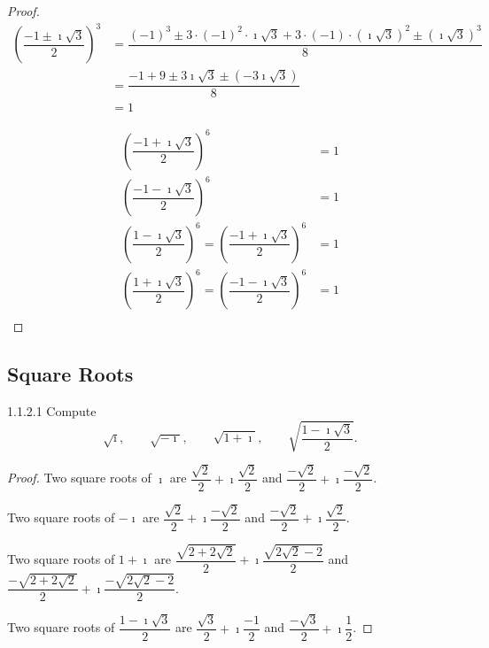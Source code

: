 \begin{proof}
	\begingroup
	\allowdisplaybreaks%
	\begin{align*}
		{\left( \dfrac{-1 \pm \imath\sqrt{3}}{2} \right)}^{3} & = \dfrac{{(-1)}^{3} \pm 3\cdot{(-1)}^{2}\cdot \imath\sqrt{3} + 3\cdot (-1)\cdot {(\imath\sqrt{3})}^{2} \pm {(\imath\sqrt{3})}^{3} }{8} \\
		                                                      & = \dfrac{-1 + 9 \pm 3\imath\sqrt{3} \pm (-3\imath\sqrt{3})}{8}                                                                         \\
		                                                      & = 1
	\end{align*}
	\endgroup

	\begingroup
	\allowdisplaybreaks%
	\begin{align*}
		{\left( \dfrac{-1 + \imath\sqrt{3}}{2} \right)}^{6}                                                      & = 1 \\
		{\left( \dfrac{-1 - \imath\sqrt{3}}{2} \right)}^{6}                                                      & = 1 \\
		{\left( \dfrac{1 - \imath\sqrt{3}}{2} \right)}^{6} = {\left( \dfrac{-1 + \imath\sqrt{3}}{2} \right)}^{6} & = 1 \\
		{\left( \dfrac{1 + \imath\sqrt{3}}{2} \right)}^{6} = {\left( \dfrac{-1 - \imath\sqrt{3}}{2} \right)}^{6} & = 1 \\
	\end{align*}
	\endgroup
\end{proof}

\subsection{Square Roots}

\begin{problem}{1.1.2.1}
Compute
\[
	\sqrt{\imath},\qquad \sqrt{-\imath}, \qquad \sqrt{1 + \imath}, \qquad \sqrt{\dfrac{1 - \imath\sqrt{3}}{2}}.
\]
\end{problem}

\begin{proof}
	Two square roots of \( \imath \) are \( \dfrac{\sqrt{2}}{2} + \imath\dfrac{\sqrt{2}}{2} \) and \( \dfrac{-\sqrt{2}}{2} + \imath\dfrac{-\sqrt{2}}{2} \).

	Two square roots of \( -\imath \) are \( \dfrac{\sqrt{2}}{2} + \imath\dfrac{-\sqrt{2}}{2} \) and \( \dfrac{-\sqrt{2}}{2} + \imath\dfrac{\sqrt{2}}{2} \).

	Two square roots of \( 1 + \imath \) are \( \dfrac{\sqrt{2 + 2\sqrt{2}}}{2} + \imath\dfrac{\sqrt{2\sqrt{2} - 2}}{2} \) and \( \dfrac{-\sqrt{2 + 2\sqrt{2}}}{2} + \imath\dfrac{-\sqrt{2\sqrt{2} - 2}}{2} \).

	Two square roots of \( \dfrac{1 - \imath\sqrt{3}}{2} \) are \( \dfrac{\sqrt{3}}{2} + \imath\dfrac{-1}{2} \) and \( \dfrac{-\sqrt{3}}{2} + \imath\dfrac{1}{2} \).
\end{proof}

